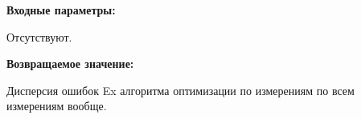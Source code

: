 \textbf{Входные параметры:}

Отсутствуют.

\textbf{Возвращаемое значение:}

Дисперсия ошибок Ex алгоритма оптимизации по измерениям по всем измерениям вообще.